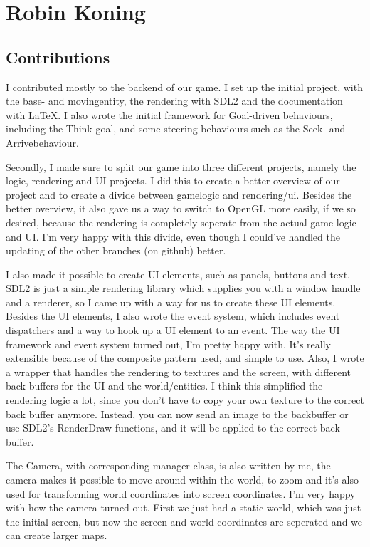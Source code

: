 \section{Robin Koning}

\subsection{Contributions}
I contributed mostly to the backend of our game. I set up the initial 
project, with the base- and movingentity, the rendering with SDL2 and the 
documentation with \LaTeX. I also wrote the initial framework for 
Goal-driven behaviours, including the Think goal, and some steering 
behaviours such as the Seek- and Arrivebehaviour. 

Secondly, I made sure to split our game into three different projects, 
namely the logic, rendering and UI projects. I did this to create a better 
overview of our project and to create a divide between gamelogic and 
rendering/ui. Besides the better overview, it also gave us a way to switch to 
OpenGL more easily, if we so desired, because the rendering is completely 
seperate from the actual game logic and UI. I'm very happy with this divide, 
even though I could've handled the updating of the other branches (on github) 
better.

I also made it possible to create UI elements, such as panels, buttons and 
text. SDL2 is just a simple rendering library which supplies 
you with a window handle and a renderer, so I came up with a way for us to 
create these UI elements. Besides the UI elements, I also wrote the event 
system, which includes event dispatchers and a way to hook up a UI element 
to an event. The way the UI framework and event system turned out, I'm pretty 
happy with. It's really extensible because of the composite pattern used, and 
simple to use.
Also, I wrote a wrapper that handles the rendering to textures and the 
screen, with different back buffers for the UI and the world/entities. I 
think this simplified the rendering logic a lot, since you don't have to copy 
your own texture to the correct back buffer anymore. Instead, you can now 
send an image to the backbuffer or use SDL2's RenderDraw functions, and 
it will be applied to the correct back buffer.

The Camera, with corresponding manager class, is also written by me, the 
camera makes it possible to move around within the world, to zoom and it's 
also used for transforming world coordinates into screen coordinates. I'm 
very happy with how the camera turned out. First we just had a static world, 
which was just the initial screen, but now the screen and world coordinates 
are seperated and we can create larger maps.

